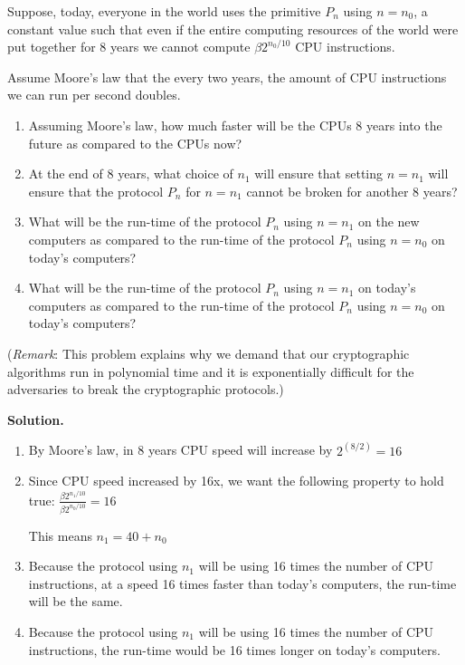 \documentclass[11pt]{article}
\begin{document}
\begin{enumerate}
  Suppose, today, everyone in the world uses the primitive $P_n$ using $n=n_0$, a constant value such that even if the entire computing resources of the world were put together for 8 years we cannot compute $\beta 2^{n_0/10}$ CPU instructions. 
  
  Assume Moore's law that the every two years, the amount of CPU instructions we can run per second doubles. 
  
  \begin{enumerate}
  \item Assuming Moore's law, how much faster will be the CPUs 8 years into the future as compared to the CPUs now? 
  \item At the end of 8 years, what choice of $n_1$ will ensure that setting $n=n_1$ will ensure that the protocol $P_n$ for $n=n_1$ cannot be broken for another 8 years? 
  \item What will be the run-time of the protocol $P_n$ using $n=n_1$ on the new computers as compared to the run-time of the protocol $P_n$ using $n=n_0$ on today's computers? 
  \item What will be the run-time of the protocol $P_n$ using $n=n_1$ on today's computers as compared to the run-time of the protocol $P_n$ using $n=n_0$ on today's computers? 
  \end{enumerate}
  
  ({\footnotesize {\em Remark}: This problem explains why we demand that our cryptographic algorithms run in polynomial time and it is exponentially difficult for the adversaries to break the cryptographic protocols.})
    
  {\bfseries Solution.} 
  \begin{enumerate}
  \item By Moore's law, in 8 years CPU speed will increase by $2^(8/2) = 16$
  \item Since CPU speed increased by 16x, we want the following property to hold true: $\frac{\beta 2^{n_1/10}}{\beta 2^{n_0/10}} = 16$
  
  	This means $n_1 = 40 + n_0$
  \item Because the protocol using $n_1$ will be using 16 times the number of CPU instructions, at a speed 16 times faster than today's computers, the run-time will be the same.
  \item Because the protocol using $n_1$ will be using 16 times the number of CPU instructions, the run-time would be 16 times longer on today's computers.
  \end{enumerate}
    







\end{enumerate}
\end{document}
